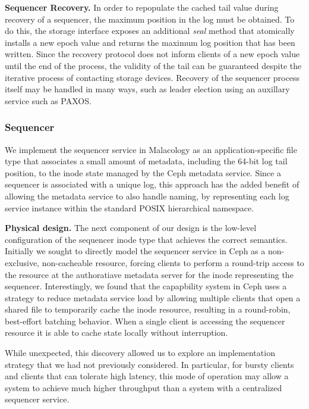 \documentclass[10pt,twocolumn]{article}
\begin{document}
{\bf Sequencer Recovery.}
In order to repopulate the cached tail value during recovery of a sequencer,
the maximum position in the log must be obtained. To do this, the storage
interface exposes an additional \emph{seal} method that atomically installs a
new epoch value and returns the maximum log position that has been written.
Since the recovery protocol does not inform clients of a new epoch value until
the end of the process, the validity of the tail can be guaranteed despite the
iterative process of contacting storage devices.  Recovery of the sequencer
process itself may be handled in many ways, such as leader election using an
auxillary service such as PAXOS.

\subsubsection{Sequencer}

We implement the sequencer service in Malacology as an application-specific
file type that associates a small amount of metadata, including the 64-bit log
tail position, to the inode state managed by the Ceph metadata service.  Since
a sequencer is associated with a unique log, this approach has the added
benefit of allowing the metadata service to also handle naming, by
representing each log service instance within the standard POSIX hierarchical
namespace.

{\bf Physical design.}
The next component of our design is the low-level configuration of the
sequencer inode type that achieves the correct semantics.  Initially we sought
to directly model the sequencer service in Ceph as a non-exclusive,
non-cacheable resource, forcing clients to perform a round-trip access to the
resource at the authoratiave metadata server for the inode representing the
sequencer.  Interestingly, we found that the capapbility system in Ceph uses a
strategy to reduce metadata service load by allowing multiple clients that
open a shared file to temporarily cache the inode resource, resulting in a
round-robin, best-effort batching behavior. When a single client is accessing
the sequencer resource it is able to cache state locally without interruption.

While unexpected, this discovery allowed us to explore an implementation
strategy that we had not previously considered. In particular, for bursty
clients and clients that can tolerate high latency, this mode of operation may
allow a system to achieve much higher throughput than a system with a
centralized sequencer service.
\end{document}
